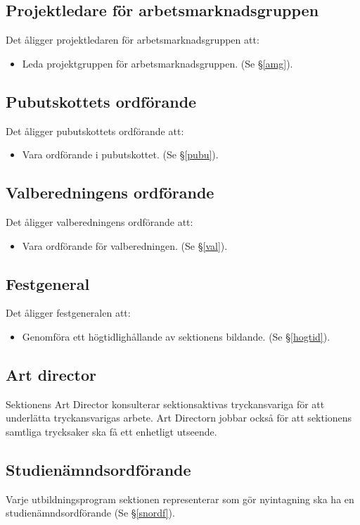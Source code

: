 \documentclass{datateknologsektionen-document}
\begin{document}
\subsection{Projektledare för arbetsmarknadsgruppen}
Det åligger projektledaren för arbetsmarknadsgruppen att:
\begin{itemize}
  \item Leda projektgruppen för arbetsmarknadsgruppen. (Se \S \ref{amg}).
\end{itemize}
\subsection{Pubutskottets ordförande}
Det åligger pubutskottets ordförande att:
\begin{itemize}
  \item Vara ordförande i pubutskottet. (Se \S \ref{pubu}).
\end{itemize}

\subsection{Valberedningens ordförande}
\label{valordforande}
Det åligger valberedningens ordförande att:
\begin{itemize}
  \item Vara ordförande för valberedningen. (Se \S \ref{val}).
\end{itemize}
\subsection{Festgeneral}
Det åligger festgeneralen att:
\begin{itemize}
  \item Genomföra ett högtidlighållande av sektionens bildande. (Se \S \ref{hogtid}).
\end{itemize}
\subsection{Art director}
\label{ad}
Sektionens Art Director konsulterar sektionsaktivas tryckansvariga för att underlätta
tryckansvarigas arbete. Art Directorn jobbar också för att sektionens samtliga trycksaker ska få ett
enhetligt utseende.
\subsection{Studienämndsordförande}
Varje utbildningsprogram sektionen representerar som gör nyintagning ska ha en
studienämndsordförande (Se \S \ref{snordf}).
\end{document}
